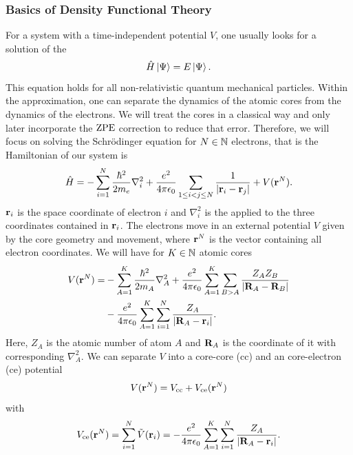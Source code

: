\documentclass[8.5pt,twoside,twocolumn]{article}
\newcommand\zpe{\enmat{\te{ZPE}}}
\renewcommand\r{\bo r}
\theoremstyle{standard}
\begin{document}
\subsubsection{Basics of Density Functional Theory}
For a system with a time-independent potential $V$, one usually looks for a
solution of the 
\begin{equation}
 \hat{H} \left|\Psi{}\right\rangle = E \left|\Psi{}\right\rangle.
 \label{Theo:Schroedinger}
\end{equation}
This equation holds for all non-relativistic quantum mechanical particles.
Within the  approximation, one can separate the dynamics
of the atomic cores from the dynamics of the electrons. We will treat the cores
in a classical way and only later incorporate the $\zpe$ correction to reduce
that error. Therefore, we will focus on solving the Schrödinger
equation for $N \in \mathbb{N}$ electrons, that is the Hamiltonian of our system is
\begin{equation}
 \Ha = -\sum_{i=1}^N \frac{\hbar^2}{2m_e} \nabla_i^2 + \frac {e^2} {4 \pi \e_0} \sum_{1\le i < j \le N} \frac 1 {\abs{\r_i - \r_j}} + V(\r^N).
 \label{Theo:Hamiltonian}
\end{equation}
$\r_i$ is the space coordinate of electron $i$ and $\nabla_i^2$ is the  applied to the three coordinates contained in $\r_i$. 
The electrons move in an external potential $V$ given by the core geometry and movement, where $\r^N$ is the vector containing
all electron coordinates. We will have for $K \in \mathbb{N}$ atomic cores 
\begin{equation}
\begin{aligned}
V(\r^N)=&-\sum_{A=1}^K \frac{\hbar^2}{2m_A} \nabla_A^2 + \frac {e^2} {4 \pi
\e_0} \sum_{A=1}^K \sum_{B>A} \frac {Z_A Z_B} {\abs{\bo R_A - \bo R_B}} \\
   &- \frac {e^2} {4 \pi \e_0} \sum_{A=1}^K \sum_{i=1}^N \frac {Z_A} {\abs{\bo R_A - \r_i}}. 
\end{aligned}
\label{Theo:CorePotential}
\end{equation}
Here, $Z_A$ is the atomic number of atom $A$ and $\mathbf{R}_A$ is the coordinate of it with corresponding $\nabla_A^2$. We
can separate $V$ into a core-core (cc) and an core-electron (ce) potential
\newcommand\vce{V_{\te{ce}}}
\newcommand\vcc{V_{\te{cc}}}
\begin{equation}
 V(\r^N)=\vcc+\vce(\r^N)
\label{Theo:SeparatePotential}
\end{equation}
with
\begin{equation}
 \vce(\r^N)=\sum_{i=1}^N \tilde V(\r_i) = - \frac {e^2} {4 \pi \e_0} \sum_{A=1}^K \sum_{i=1}^N \frac {Z_A} {\abs{\bo R_A - \r_i}}.
 \label{Theo:CoreElectronPotential}
\end{equation}
\end{document}
